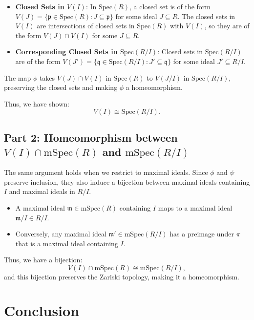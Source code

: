 \documentclass[11pt,openany]{article}
\begin{document}
\begin{itemize}
	\item \textbf{Closed Sets in \( V(I) \)}: In \( \text{Spec}(R) \), a closed set is of the form \( V(J) = \{ \mathfrak{p} \in \text{Spec}(R) : J \subseteq \mathfrak{p} \} \) for some ideal \( J \subseteq R \). The closed sets in \( V(I) \) are intersections of closed sets in \( \text{Spec}(R) \) with \( V(I) \), so they are of the form \( V(J) \cap V(I) \) for some \( J \subseteq R \).
	
	\item \textbf{Corresponding Closed Sets in \( \text{Spec}(R/I) \)}: Closed sets in \( \text{Spec}(R/I) \) are of the form \( V(J') = \{ \mathfrak{q} \in \text{Spec}(R/I) : J' \subseteq \mathfrak{q} \} \) for some ideal \( J' \subseteq R/I \).
\end{itemize}

The map \( \phi \) takes \( V(J) \cap V(I) \) in \( \text{Spec}(R) \) to \( V(J/I) \) in \( \text{Spec}(R/I) \), preserving the closed sets and making \( \phi \) a homeomorphism.

Thus, we have shown:
\[
V(I) \cong \text{Spec}(R/I).
\]

\subsection*{Part 2: Homeomorphism between \( V(I) \cap \text{mSpec}(R) \) and \( \text{mSpec}(R/I) \)}

The same argument holds when we restrict to maximal ideals. Since \( \phi \) and \( \psi \) preserve inclusion, they also induce a bijection between maximal ideals containing \( I \) and maximal ideals in \( R/I \).

\begin{itemize}
	\item A maximal ideal \( \mathfrak{m} \in \text{mSpec}(R) \) containing \( I \) maps to a maximal ideal \( \mathfrak{m}/I \in R/I \).
	\item Conversely, any maximal ideal \( \mathfrak{m}' \in \text{mSpec}(R/I) \) has a preimage under \( \pi \) that is a maximal ideal containing \( I \).
\end{itemize}

Thus, we have a bijection:
\[
V(I) \cap \text{mSpec}(R) \cong \text{mSpec}(R/I),
\]
and this bijection preserves the Zariski topology, making it a homeomorphism.

\section*{Conclusion}
\end{document}
